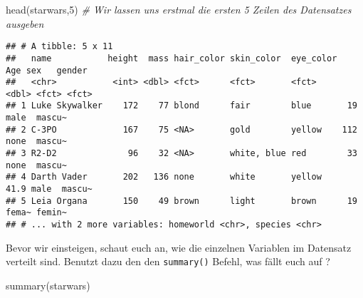 \documentclass[
]{book}
\newenvironment{Shaded}{\begin{snugshade}}{\end{snugshade}}
\newcommand{\CommentTok}[1]{\textcolor[rgb]{0.56,0.35,0.01}{\textit{#1}}}
\newcommand{\DecValTok}[1]{\textcolor[rgb]{0.00,0.00,0.81}{#1}}
\newcommand{\FunctionTok}[1]{\textcolor[rgb]{0.00,0.00,0.00}{#1}}
\newcommand{\NormalTok}[1]{#1}
\theoremstyle{definition}
\theoremstyle{definition}
\theoremstyle{definition}
\theoremstyle{definition}
\theoremstyle{remark}
\begin{document}
\begin{Shaded}
\begin{Highlighting}[]
\FunctionTok{head}\NormalTok{(starwars,}\DecValTok{5}\NormalTok{) }\CommentTok{\# Wir lassen uns erstmal die ersten 5 Zeilen des Datensatzes ausgeben}
\end{Highlighting}
\end{Shaded}

\begin{verbatim}
## # A tibble: 5 x 11
##   name           height  mass hair_color skin_color  eye_color   Age sex   gender
##   <chr>           <int> <dbl> <fct>      <fct>       <fct>     <dbl> <fct> <fct> 
## 1 Luke Skywalker    172    77 blond      fair        blue       19   male  mascu~
## 2 C-3PO             167    75 <NA>       gold        yellow    112   none  mascu~
## 3 R2-D2              96    32 <NA>       white, blue red        33   none  mascu~
## 4 Darth Vader       202   136 none       white       yellow     41.9 male  mascu~
## 5 Leia Organa       150    49 brown      light       brown      19   fema~ femin~
## # ... with 2 more variables: homeworld <chr>, species <chr>
\end{verbatim}

Bevor wir einsteigen, schaut euch an, wie die einzelnen Variablen im Datensatz verteilt sind. Benutzt dazu den den \texttt{summary()} Befehl, was fällt euch auf ?

\begin{Shaded}
\begin{Highlighting}[]
\FunctionTok{summary}\NormalTok{(starwars)}
\end{Highlighting}
\end{Shaded}
\end{document}
